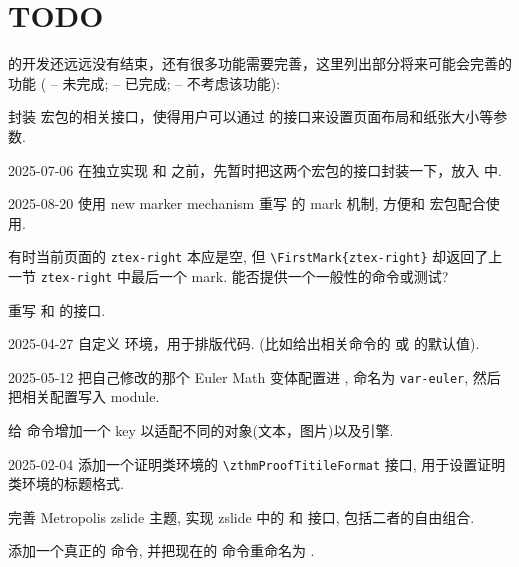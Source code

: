 \clearpage
{}
\section{TODO}
\ztex{} 的开发还远远没有结束，还有很多功能需要完善，这里列出部分将来可能会完善的功能%
(\undone{} -- 未完成; \done{} -- 已完成; \wontfix{} -- 不考虑该功能):


\let\olditem\item
{}
  {
      {\color{black}%
        \olditem{}\color{gray}}
      {\color{black}%
        \olditem}
  }
\begin{todolist}
  \item 封装  宏包的相关接口，使得用户可以通过 \ztex{} 的接口来设置页面布局和纸张大小等参数.
  \item [2025-07-06] 在独立实现  和  之前，先暂时把这两个宏包的接口封装一下，放入 \ztex{} 中.
  \item [2025-08-20] 使用 new marker mechanism 重写  的 mark 机制, 方便和  宏包配合使用.
  \item*[使用 \texttt{\char92IfMarksEqualTF[page]\{ztex-right\}\{top\}\{first\}} 进行比较即可] 有时当前页面的 \texttt{ztex-right} 本应是空, 但 \verb|\FirstMark{ztex-right}| 却返回了上一节 \texttt{ztex-right} 中最后一个 mark. 能否提供一个一般性的命令或测试?
  \item 重写 \cmd{\zpagestyleset} 和  的接口.
  \item [2025-04-27] 自定义  环境，用于排版代码. (比如给出相关命令的  或  的默认值).
  \item [2025-05-12] 把自己修改的那个 Euler Math 变体配置进 \ztex{}, 命名为 \texttt{var-euler}, 然后把相关配置写入  module.
  \item 给  命令增加一个  key 以适配不同的对象(文本，图片)以及引擎.
  \item [2025-02-04] 添加一个证明类环境的 \verb|\zthmProofTitileFormat| 接口, 用于设置证明类环境的标题格式.
  \item 完善 Metropolis zslide 主题, 实现 zslide 中的  和  接口, 包括二者的自由组合.
  \item*[使用 \cs{thepage} 命令足矣] 添加一个真正的  命令, 并把现在的  命令重命名为 .

\end{todolist}
